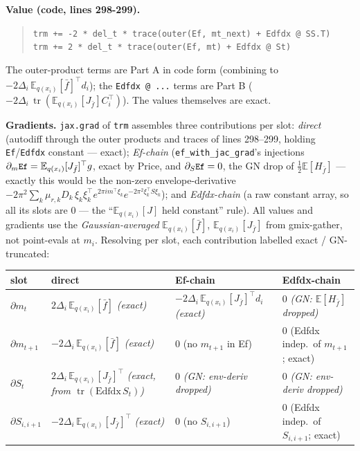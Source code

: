 \documentclass[11pt]{article}
\newcommand{\E}{\mathbb{E}}
\newcommand{\Eqx}{\mathbb{E}_{q(x_i)}}
\newcommand{\tr}{\operatorname{tr}}
\newcommand{\code}[1]{\texttt{\small #1}}
\begin{document}
\textbf{Value (code, lines 298-299).}
\begin{quote}
\code{trm += -2 * del\_t * trace(outer(Ef, mt\_next) + Edfdx @ SS.T)}\\
\code{trm +=  2 * del\_t * trace(outer(Ef, mt)      + Edfdx @ St)}
\end{quote}
The outer-product terms are Part A in code form (combining to
$-2\Delta_i\,\Eqx[\bar f]^\top d_i$); the \code{Edfdx @ ...} terms are
Part B ($-2\Delta_i\,\tr(\Eqx[J_{\bar f}] C_i^\top)$). The values
themselves are exact.

\textbf{Gradients.} \code{jax.grad} of \code{trm} assembles three
contributions per slot: \emph{direct} (autodiff through the outer
products and traces of lines 298--299, holding \code{Ef}/\code{Edfdx}
constant --- exact); \emph{Ef-chain} (\code{ef\_with\_jac\_grad}'s
injections $\partial_m\code{Ef}=\Eqx[J_{\bar f}]^\top g$, exact by Price,
and $\partial_S\code{Ef}=0$, the GN drop of
$\tfrac12\E[H_{\bar f}]$ --- exactly this would be the non-zero
envelope-derivative
$-2\pi^2\sum_k \mu_{r,k}D_k\,\xi_k\xi_k^\top e^{2\pi i m^\top\xi_k}
e^{-2\pi^2\xi_k^\top S\xi_k}$); and \emph{Edfdx-chain} (a raw constant
array, so all its slots are $0$ --- the ``$\Eqx[J]$ held constant''
rule). All values and gradients use the \emph{Gaussian-averaged}
$\Eqx[\bar f]$, $\Eqx[J_{\bar f}]$ from gmix-gather, not point-evals at
$m_i$. Resolving per slot, each contribution labelled exact /
GN-truncated:

\begin{center}
\renewcommand{\arraystretch}{1.25}
\footnotesize
\begin{tabular}{@{}p{1.8cm}|p{5.2cm}|p{4.3cm}|p{4.0cm}@{}}
\hline
slot & direct & Ef-chain & Edfdx-chain \\\hline
$\partial m_t$       & $2\Delta_i\,\Eqx[\bar f]$ \emph{(exact)} & $-2\Delta_i\,\Eqx[J_{\bar f}]^\top d_i$ \emph{(exact)} & $0$ \emph{(GN: $\E[H_{\bar f}]$ dropped)} \\
$\partial m_{t+1}$   & $-2\Delta_i\,\Eqx[\bar f]$ \emph{(exact)} & $0$ (no $m_{t+1}$ in Ef) & $0$ (Edfdx indep.\ of $m_{t+1}$; exact) \\
$\partial S_t$       & $2\Delta_i\,\Eqx[J_{\bar f}]^\top$ \emph{(exact, from $\tr(\text{Edfdx}\,S_t)$)} & $0$ \emph{(GN: env-deriv dropped)} & $0$ \emph{(GN: env-deriv dropped)} \\
$\partial S_{i,i+1}$ & $-2\Delta_i\,\Eqx[J_{\bar f}]^\top$ \emph{(exact)} & $0$ (no $S_{i,i+1}$) & $0$ (Edfdx indep.\ of $S_{i,i+1}$; exact) \\\hline
\end{tabular}
\end{center}
\end{document}
